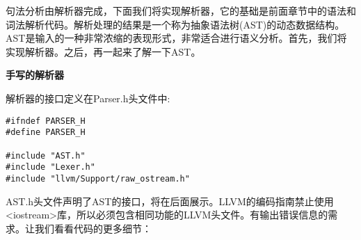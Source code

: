 句法分析由解析器完成，下面我们将实现解析器，它的基础是前面章节中的语法和词法解析代码。解析处理的结果是一个称为抽象语法树(AST)的动态数据结构。AST是输入的一种非常浓缩的表现形式，非常适合进行语义分析。首先，我们将实现解析器。之后，再一起来了解一下AST。\par


\hspace*{\fill} \par %
\textbf{手写的解析器}

解析器的接口定义在Parser.h头文件中:\par

\begin{lstlisting}[caption={}]
#ifndef PARSER_H
#define PARSER_H

#include "AST.h"
#include "Lexer.h"
#include "llvm/Support/raw_ostream.h"
\end{lstlisting}

AST.h头文件声明了AST的接口，将在后面展示。LLVM的编码指南禁止使用<iostream>库，所以必须包含相同功能的LLVM头文件。有输出错误信息的需求。让我们看看代码的更多细节：\par

